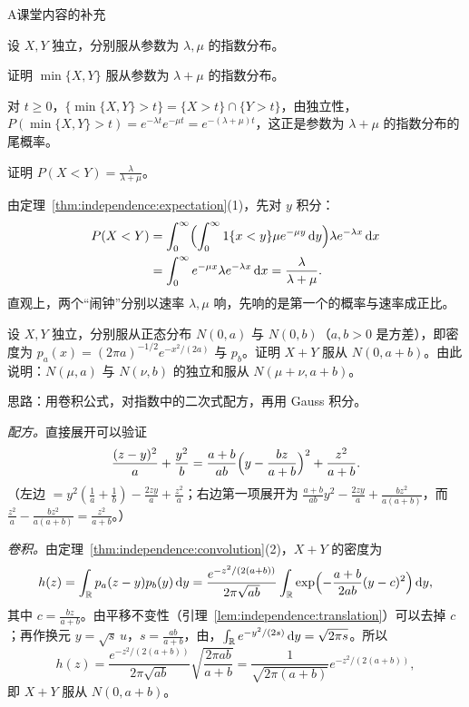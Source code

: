 \begin{exercises}{A}{课堂内容的补充}
\item\label{ex:independence:A5} 设 $X,Y$ 独立，分别服从参数为 $\lambda,\mu$ 的指数分布。
\begin{questions}
\item 证明 $\min\{X,Y\}$ 服从参数为 $\lambda+\mu$ 的指数分布。
\begin{solution}
对 $t\geqslant0$，$\{\min\{X,Y\}>t\}=\{X>t\}\cap\{Y>t\}$，由独立性，$P(\min\{X,Y\}>t)=e^{-\lambda t}e^{-\mu t}=e^{-(\lambda+\mu)t}$，这正是参数为 $\lambda+\mu$ 的指数分布的尾概率。
\end{solution}
\item 证明 $P(X<Y)=\frac\lambda{\lambda+\mu}$。
\begin{solution}
由定理~\ref{thm:independence:expectation}(1)，先对 $y$ 积分：
\[
\begin{aligned}
P(X<Y)&=\int_0^\infty\Bigl(\int_0^\infty1\{x<y\}\mu e^{-\mu y}\,\mathrm{d} y\Bigr)\lambda e^{-\lambda x}\,\mathrm{d} x\\
&=\int_0^\infty e^{-\mu x}\lambda e^{-\lambda x}\,\mathrm{d} x=\frac\lambda{\lambda+\mu}.
\end{aligned}
\]
直观上，两个“闹钟”分别以速率 $\lambda,\mu$ 响，先响的是第一个的概率与速率成正比。
\end{solution}
\end{questions}

\item\label{ex:independence:A6} 设 $X,Y$ 独立，分别服从正态分布 $N(0,a)$ 与 $N(0,b)$（$a,b>0$ 是方差），即密度为 $p_a(x)=(2\pi a)^{-1/2}e^{-x^2/(2a)}$ 与 $p_b$。证明 $X+Y$ 服从 $N(0,a+b)$。由此说明：$N(\mu,a)$ 与 $N(\nu,b)$ 的独立和服从 $N(\mu+\nu,a+b)$。
\begin{solution}
思路：用卷积公式，对指数中的二次式配方，再用 Gauss 积分。

\emph{配方。}直接展开可以验证
\[
\frac{(z-y)^2}a+\frac{y^2}b=\frac{a+b}{ab}\Bigl(y-\frac{bz}{a+b}\Bigr)^2+\frac{z^2}{a+b}.
\]
（左边 $=y^2(\frac1a+\frac1b)-\frac{2zy}a+\frac{z^2}a$；右边第一项展开为 $\frac{a+b}{ab}y^2-\frac{2zy}a+\frac{bz^2}{a(a+b)}$，而 $\frac{z^2}a-\frac{bz^2}{a(a+b)}=\frac{z^2}{a+b}$。）

\emph{卷积。}由定理~\ref{thm:independence:convolution}(2)，$X+Y$ 的密度为
\[
h(z)=\int_{\mathbb{R}} p_a(z-y)p_b(y)\,\mathrm{d} y=\frac{e^{-z^2/(2(a+b))}}{2\pi\sqrt{ab}}\int_{\mathbb{R}}\exp\Bigl(-\frac{a+b}{2ab}(y-c)^2\Bigr)\,\mathrm{d} y,
\]
其中 $c=\frac{bz}{a+b}$。由平移不变性（引理~\ref{lem:independence:translation}）可以去掉 $c$；再作换元 $y=\sqrt{s}\,u$，$s=\frac{ab}{a+b}$，由，$\int_{\mathbb{R}} e^{-y^2/(2s)}\,\mathrm{d} y=\sqrt{2\pi s}$。所以
\[
h(z)=\frac{e^{-z^2/(2(a+b))}}{2\pi\sqrt{ab}}\sqrt{\frac{2\pi ab}{a+b}}=\frac1{\sqrt{2\pi(a+b)}}e^{-z^2/(2(a+b))},
\]
即 $X+Y$ 服从 $N(0,a+b)$。


\end{solution}
\end{exercises}
